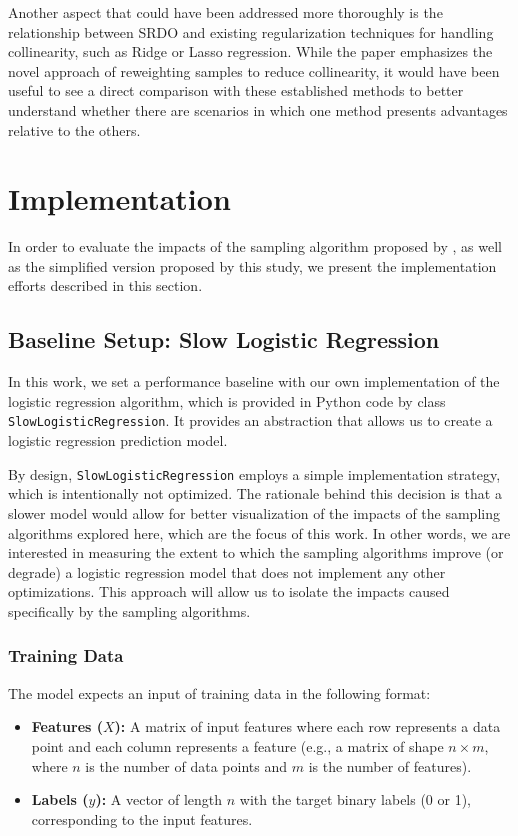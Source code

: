 \documentclass{article}
\theoremstyle{plain}
\theoremstyle{definition}
\theoremstyle{remark}
\begin{document}
Another aspect that could have been addressed more thoroughly is the relationship between SRDO and existing regularization techniques for handling collinearity, such as Ridge or Lasso regression. While the paper emphasizes the novel approach of reweighting samples to reduce collinearity, it would have been useful to see a direct comparison with these established methods to better understand whether there are scenarios in which one method presents advantages relative to the others.


\section{Implementation}

In order to evaluate the impacts of the sampling algorithm proposed by \citeauthor{chow24} \cite{chow24}, as well as the simplified version proposed by this study, we present the implementation efforts described in this section.

\subsection{Baseline Setup: Slow Logistic Regression}

In this work, we set a performance baseline with our own implementation of the logistic regression algorithm, which is provided in Python code by class \texttt{SlowLogisticRegression}. It provides an abstraction that allows us to create a logistic regression prediction model.

By design, \texttt{SlowLogisticRegression} employs a simple implementation strategy, which is intentionally not optimized. The rationale behind this decision is that a slower model would allow for better visualization of the impacts of the sampling algorithms explored here, which are the focus of this work. In other words, we are interested in measuring the extent to which the sampling algorithms improve (or degrade) a logistic regression model that does not implement any other optimizations. This approach will allow us to isolate the impacts caused specifically by the sampling algorithms.


\subsubsection{Training Data}

The model expects an input of training data in the following format:
\begin{itemize}

\item \textbf{Features ($X$):} A matrix of input features where each row represents a data point and each column represents a feature (e.g., a matrix of shape $n \times m$, where $n$ is the number of data points and $m$ is the number of features).

\item \textbf{Labels ($y$):} A vector of length $n$ with the target binary labels (0 or 1), corresponding to the input features.
\end{itemize}
\end{document}
